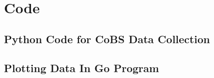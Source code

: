 \chapter{Code}
\label{appendix: Code}
\acresetall

\section{Python Code for CoBS Data Collection}

%

\clearpage

\section{Plotting Data In Go Program}

%
